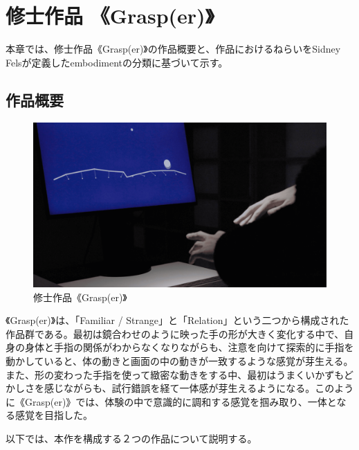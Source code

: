 \chapter{修士作品 《Grasp(er)》}
\label{about_grasper}
本章では、修士作品《Grasp(er)》の作品概要と、作品におけるねらいをSidney Felsが定義したembodimentの分類に基づいて示す。

\section{作品概要}
\begin{figure}[H]
  \centering
  \includegraphics[width=15cm]{img/thumbnail.png}
  \caption{修士作品《Grasp(er)》}
  \label{grasper}
\end{figure}

《Grasp(er)》は、「Familiar / Strange」と「Relation」という二つから構成された作品群である。最初は鏡合わせのように映った手の形が大きく変化する中で、自身の身体と手指の関係がわからなくなりながらも、注意を向けて探索的に手指を動かしていると、体の動きと画面の中の動きが一致するような感覚が芽生える。また、形の変わった手指を使って緻密な動きをする中、最初はうまくいかずもどかしさを感じながらも、試行錯誤を経て一体感が芽生えるようになる。このように《Grasp(er)》では、体験の中で意識的に調和する感覚を掴み取り、一体となる感覚を目指した。

以下では、本作を構成する２つの作品について説明する。



